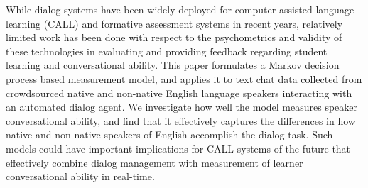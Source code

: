While dialog systems have been widely deployed for computer-assisted language learning (CALL) and formative assessment systems in recent years, relatively limited work has been done with respect to the psychometrics and validity of these technologies in evaluating and providing feedback regarding student learning and conversational ability. This paper formulates a Markov decision process based measurement model, and applies it to text chat data collected from crowdsourced native and non-native English language speakers interacting with an automated dialog agent. We investigate how well the model measures speaker conversational ability, and find that it effectively captures the differences in how native and non-native speakers of English accomplish the dialog task. Such models could have important implications for CALL systems of the future that effectively combine dialog management with measurement of learner conversational ability in real-time.
